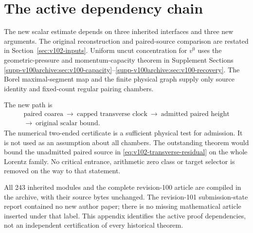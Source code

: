 \section{The active dependency chain}\label{app:v102-dependencies}
The new scalar estimate depends on three inherited interfaces and
three new arguments. The original reconstruction and paired-source
comparison are restated in Section~\ref{sec:v102-inputs}. Uniform
uncut concentration for $v^0$ uses the geometric-pressure and
momentum-capacity theorem in Supplement Sections
\ref{supp-v100archive:sec:v100-capacity}--\ref{supp-v100archive:sec:v100-recovery}.
The Borel maximal-segment map and the finite physical graph supply
only source identity and fixed-count regular pairing chambers.

The new path is
\begin{gather*}
 \text{paired coarea}\ \longrightarrow\
 \text{capped transverse clock}\ \longrightarrow\
 \text{admitted paired height}\\
 \longrightarrow\ \text{original scalar bound}.
\end{gather*}
The numerical two-ended certificate is a sufficient physical test
for admission. It is not used as an assumption about all chambers.
The outstanding theorem would bound the unadmitted paired source
in \eqref{eq:v102-transverse-residual} on the whole Lorentz family.
No critical entrance, arithmetic zero class or target selector is
removed on the way to that statement.

All 243 inherited modules and the complete revision-100 article are
compiled in the archive, with their source bytes unchanged. The
revision-101 submission-state report contained no new author paper;
there is no missing mathematical article inserted under that label.
This appendix identifies the active proof dependencies, not an
independent certification of every historical theorem.
